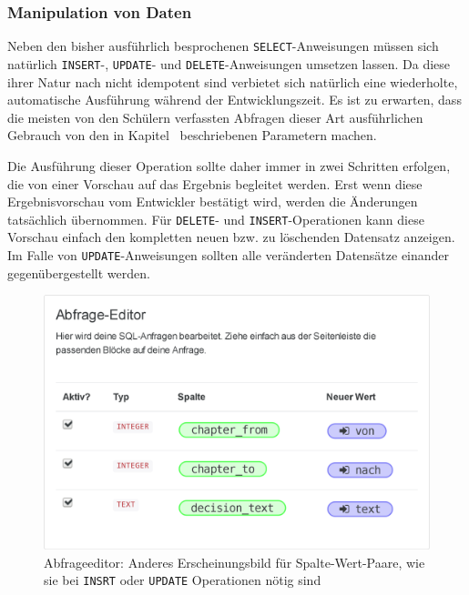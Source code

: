 \subsubsection{Manipulation von Daten}

Neben den bisher ausführlich besprochenen \texttt{SELECT}-Anweisungen müssen sich natürlich \texttt{INSERT}-, \texttt{UPDATE}- und \texttt{DELETE}-Anweisungen umsetzen lassen. Da diese ihrer Natur nach nicht idempotent sind verbietet sich natürlich eine wiederholte, automatische Ausführung während der Entwicklungszeit. Es ist zu erwarten, dass die meisten von den Schülern verfassten Abfragen dieser Art ausführlichen Gebrauch von den in Kapitel~ beschriebenen Parametern machen.

Die Ausführung dieser Operation sollte daher immer in zwei Schritten erfolgen, die von einer Vorschau auf das Ergebnis begleitet werden. Erst wenn diese Ergebnisvorschau vom Entwickler bestätigt wird, werden die Änderungen tatsächlich übernommen. Für \texttt{DELETE}- und \texttt{INSERT}-Operationen kann diese Vorschau einfach den kompletten neuen bzw. zu löschenden Datensatz anzeigen. Im Falle von \texttt{UPDATE}-Anweisungen sollten alle veränderten Datensätze einander gegenübergestellt werden.

\begin{figure}[h]
  \includegraphics[width=\textwidth]{images/sql-insert-key-value-pairs}
  \caption{Abfrageeditor: Anderes Erscheinungsbild für Spalte-Wert-Paare, wie sie bei \texttt{INSRT} oder \texttt{UPDATE} Operationen nötig sind}
  \label{fig:screen-sql-editor-insert-key-value-pairs}
\end{figure}

